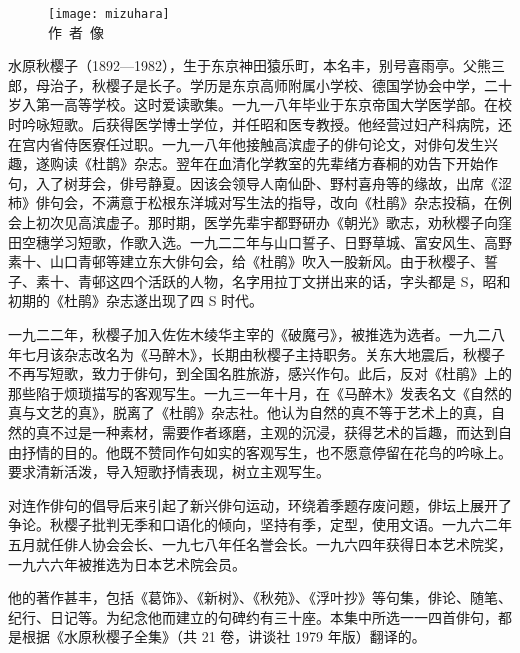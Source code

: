 \begin{center}
    \begin{figure}
        \centering
        \texttt{[image: mizuhara]}\\[1em]
        \large{\FS 作~者~像}
    \end{figure}
\end{center}

\newpage

{\FS
    水原秋樱子（1892—1982），生于东京神田猿乐町，本名丰，别号喜雨亭。父熊三郎，母治子，秋樱子是长子。学历是东京高师附属小学校、德国学协会中学，二十岁入第一高等学校。这时爱读歌集。一九一八年毕业于东京帝国大学医学部。在校时吟咏短歌。后获得医学博士学位，并任昭和医专教授。他经营过妇产科病院，还在宫内省侍医寮任过职。一九一八年他接触高滨虚子的俳句论文，对俳句发生兴趣，遂购读《杜鹊》杂志。翌年在血清化学教室的先辈绪方春桐的劝告下开始作句，入了树芽会，俳号静夏。因该会领导人南仙卧、野村喜舟等的缘故，出席《涩柿》俳句会，不满意于松根东洋城对写生法的指导，改向《杜鹃》杂志投稿，在例会上初次见高滨虚子。那时期，医学先辈宇都野研办《朝光》歌志，劝秋樱子向窪田空穗学习短歌，作歌入选。一九二二年与山口誓子、日野草城、富安风生、高野素十、山口青邨等建立东大俳句会，给《杜鹃》吹入一股新风。由于秋樱子、誓子、素十、青邨这四个活跃的人物，名字用拉丁文拼出来的话，字头都是 S，昭和初期的《杜鹃》杂志遂出现了四 S 时代。

    一九二二年，秋樱子加入佐佐木绫华主宰的《破魔弓》，被推选为选者。一九二八年七月该杂志改名为《马醉木》，长期由秋樱子主持职务。关东大地震后，秋樱子不再写短歌，致力于俳句，到全国名胜旅游，感兴作句。此后，反对《杜鹃》上的那些陷于烦琐描写的客观写生。一九三一年十月，在《马醉木》发表名文《自然的真与文艺的真》，脱离了《杜鹃》杂志社。他认为自然的真不等于艺术上的真，自然的真不过是一种素材，需要作者琢磨，主观的沉浸，获得艺术的旨趣，而达到自由抒情的目的。他既不赞同作句如实的客观写生，也不愿意停留在花鸟的吟咏上。要求清新活泼，导入短歌抒情表现，树立主观写生。

    对连作俳句的倡导后来引起了新兴俳句运动，环绕着季题存废问题，俳坛上展开了争论。秋樱子批判无季和口语化的倾向，坚持有季，定型，使用文语。一九六二年五月就任俳人协会会长、一九七八年任名誉会长。一九六四年获得日本艺术院奖，一九六六年被推选为日本艺术院会员。

    他的著作甚丰，包括《葛饰》、《新树》、《秋苑》、《浮叶抄》等句集，俳论、随笔、纪行、日记等。为纪念他而建立的句碑约有三十座。本集中所选一一四首俳句，都是根据《水原秋樱子全集》（共 21 卷，讲谈社 1979 年版）翻译的。
}

\newpage

